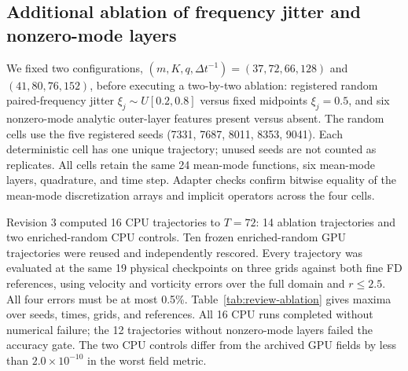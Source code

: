 \subsection{Additional ablation of frequency jitter and nonzero-mode layers}
\label{sec:review-ablation}
We fixed two configurations,
$(m,K,q,\Delta t^{-1})=(37,72,66,128)$ and $(41,80,76,152)$,
before executing a two-by-two ablation: registered random paired-frequency
jitter $\xi_j\sim U[0.2,0.8]$ versus fixed midpoints $\xi_j=0.5$, and six
nonzero-mode analytic outer-layer features present versus absent.
The random cells use the five registered seeds (7331, 7687, 8011, 8353, 9041).
Each deterministic cell has one unique trajectory; unused seeds are not counted
as replicates. All cells retain the same 24 mean-mode functions, six mean-mode
layers, quadrature, and time step. Adapter checks confirm bitwise equality of
the mean-mode discretization arrays and implicit operators across the four cells.

Revision 3 computed 16 CPU trajectories to $T=72$: 14 ablation trajectories and
two enriched-random CPU controls. Ten frozen enriched-random GPU trajectories
were reused and independently rescored. Every trajectory was evaluated at the
same 19 physical checkpoints on three grids against both fine FD references,
using velocity and vorticity errors over the full domain and $r\leq2.5$.
All four errors must be at most 0.5\%.
Table~\ref{tab:review-ablation} gives maxima over seeds, times, grids, and references.
All 16 CPU runs completed without numerical failure; the 12 trajectories without
nonzero-mode layers failed the accuracy gate. The two CPU controls differ from
the archived GPU fields by less than $2.0\times10^{-10}$ in the worst field metric.

